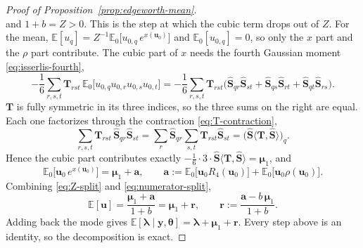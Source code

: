 \begin{proof}[Proof of Proposition~\ref{prop:edgeworth-mean}]
\begin{equation}
    \label{eq:Z-split}
\end{equation}
and $1+b=Z>0$. This is the step at which the cubic term drops out of $Z$. For the mean, $\mathbb{E}[u_{q}]=Z^{-1}\mathbb{E}_{0}\big[u_{0,q}\,e^{x(\bm{u}_{0})}\big]$ and $\mathbb{E}_{0}[u_{0,q}]=0$, so only the $x$ part and the $\rho$ part contribute. The cubic part of $x$ needs the fourth Gaussian moment \eqref{eq:isserlis-fourth},
\begin{equation}
    -\frac{1}{6}\sum_{r,s,t}\mathbf{T}_{rst}\,\mathbb{E}_{0}\big[u_{0,q}u_{0,r}u_{0,s}u_{0,t}\big]=-\frac{1}{6}\sum_{r,s,t}\mathbf{T}_{rst}\Big(\hat{\mathbf{S}}_{qr}\hat{\mathbf{S}}_{st}+\hat{\mathbf{S}}_{qs}\hat{\mathbf{S}}_{rt}+\hat{\mathbf{S}}_{qt}\hat{\mathbf{S}}_{rs}\Big).
    \label{eq:isserlis-step}
\end{equation}
$\mathbf{T}$ is fully symmetric in its three indices, so the three sums on the right are equal. Each one factorizes through the contraction \eqref{eq:T-contraction},
\begin{equation}
    \sum_{r,s,t}\mathbf{T}_{rst}\,\hat{\mathbf{S}}_{qr}\hat{\mathbf{S}}_{st}=\sum_{r}\hat{\mathbf{S}}_{qr}\sum_{s,t}\mathbf{T}_{rst}\hat{\mathbf{S}}_{st}=\Big(\hat{\mathbf{S}}\big\langle\mathbf{T},\hat{\mathbf{S}}\big\rangle\Big)_{q}.
    \label{eq:isserlis-collapse}
\end{equation}
Hence the cubic part contributes exactly $-\frac{1}{6}\cdot3\cdot\hat{\mathbf{S}}\big\langle\mathbf{T},\hat{\mathbf{S}}\big\rangle=\bm{\mu}_{1}$, and
\begin{equation}
    \mathbb{E}_{0}\big[\bm{u}_{0}\,e^{x(\bm{u}_{0})}\big]=\bm{\mu}_{1}+\bm{a},\qquad\bm{a}:=\mathbb{E}_{0}\big[\bm{u}_{0}R_{4}(\bm{u}_{0})\big]+\mathbb{E}_{0}\big[\bm{u}_{0}\rho(\bm{u}_{0})\big].
    \label{eq:numerator-split}
\end{equation}
Combining \eqref{eq:Z-split} and \eqref{eq:numerator-split},
\begin{equation}
    \mathbb{E}[\bm{u}]=\frac{\bm{\mu}_{1}+\bm{a}}{1+b}=\bm{\mu}_{1}+\bm{r},\qquad\bm{r}:=\frac{\bm{a}-b\,\bm{\mu}_{1}}{1+b}.
    \label{eq:remainder-def}
\end{equation}
Adding back the mode gives $\mathbb{E}[\bm{\lambda}\mid\bm{y},\bm{\theta}]=\hat{\bm{\lambda}}+\bm{\mu}_{1}+\bm{r}$. Every step above is an identity, so the decomposition is exact.
\end{proof}

